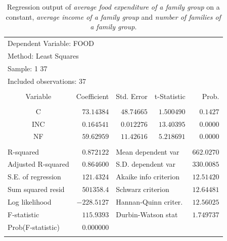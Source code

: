 \documentclass[12pt]{report}
\begin{document}
\begin{table}[H]
	\centering
	\begin{tabular}{lrrrr}
		\multicolumn{3}{l}{Dependent Variable: FOOD}&\multicolumn{1}{c}{}&\multicolumn{1}{c}{}\\
		\multicolumn{3}{l}{Method: Least Squares}&\multicolumn{1}{c}{}&\multicolumn{1}{c}{}\\
		\multicolumn{2}{l}{Sample: 1 37}&\multicolumn{1}{c}{}&\multicolumn{1}{c}{}&\multicolumn{1}{c}{}\\
		\multicolumn{3}{l}{Included observations: 37}&\multicolumn{1}{c}{}&\multicolumn{1}{c}{}\\
		[4.5pt] \hline \\ [-4.5pt]
		\multicolumn{1}{c}{Variable}&\multicolumn{1}{r}{Coefficient}&\multicolumn{1}{r}{Std. Error}&\multicolumn{1}{r}{t-Statistic}&\multicolumn{1}{r}{Prob.}\\
		[4.5pt] \hline \\ [-4.5pt]
		\multicolumn{1}{c}{C}&\multicolumn{1}{r}{$73.14384$}&\multicolumn{1}{r}{$48.74665$}&\multicolumn{1}{r}{$1.500490$}&\multicolumn{1}{r}{$0.1427$}\\
		\multicolumn{1}{c}{INC}&\multicolumn{1}{r}{$0.164541$}&\multicolumn{1}{r}{$0.012276$}&\multicolumn{1}{r}{$13.40395$}&\multicolumn{1}{r}{$0.0000$}\\
		\multicolumn{1}{c}{NF}&\multicolumn{1}{r}{$59.62959$}&\multicolumn{1}{r}{$11.42616$}&\multicolumn{1}{r}{$5.218691$}&\multicolumn{1}{r}{$0.0000$}\\
		[4.5pt] \hline \\ [-4.5pt]
		\multicolumn{1}{l}{R-squared}&\multicolumn{1}{r}{$0.872122$}&\multicolumn{2}{l}{Mean dependent var}&\multicolumn{1}{r}{$662.0270$}\\
		\multicolumn{1}{l}{Adjusted R-squared}&\multicolumn{1}{r}{$0.864600$}&\multicolumn{2}{l}{S.D. dependent var}&\multicolumn{1}{r}{$330.0085$}\\
		\multicolumn{1}{l}{S.E. of regression}&\multicolumn{1}{r}{$121.4324$}&\multicolumn{2}{l}{Akaike info criterion}&\multicolumn{1}{r}{$12.51420$}\\
		\multicolumn{1}{l}{Sum squared resid}&\multicolumn{1}{r}{$501358.4$}&\multicolumn{2}{l}{Schwarz criterion}&\multicolumn{1}{r}{$12.64481$}\\
		\multicolumn{1}{l}{Log likelihood}&\multicolumn{1}{r}{$-228.5127$}&\multicolumn{2}{l}{Hannan-Quinn criter.}&\multicolumn{1}{r}{$12.56025$}\\
		\multicolumn{1}{l}{F-statistic}&\multicolumn{1}{r}{$115.9393$}&\multicolumn{2}{l}{Durbin-Watson stat}&\multicolumn{1}{r}{$1.749737$}\\
		\multicolumn{1}{l}{Prob(F-statistic)}&\multicolumn{1}{r}{$0.000000$}&\multicolumn{1}{c}{}&\multicolumn{1}{c}{}&\multicolumn{1}{c}{}\\
		[4.5pt] \hline \\ [-4.5pt]
	\end{tabular}
	\caption{Regression output of \textit{average food expenditure of a family group} on a constant, \textit{average income of a family group} and \textit{number of families of a family group}.}
\end{table}
\end{document}
